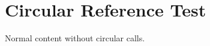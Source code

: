 \documentclass{article}
\begin{document}
\newcommand{\cmdA}{\cmdB test}
\newcommand{\cmdB}{\cmdA test}
\section{Circular Reference Test}
Normal content without circular calls.
\end{document}
